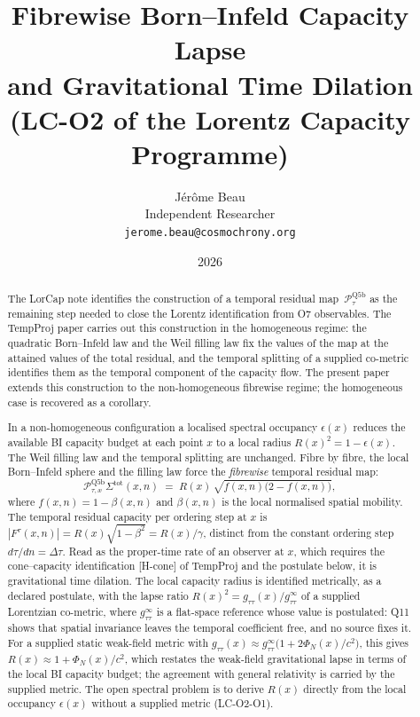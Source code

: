 \documentclass[11pt,a4paper]{article}
\title{Fibrewise Born--Infeld Capacity Lapse\\
and Gravitational Time Dilation\\
\large (LC-O2 of the Lorentz Capacity Programme)}
\author{J\'er\^ome Beau\\
\small Independent Researcher\\
\small \texttt{jerome.beau@cosmochrony.org}}
\date{2026}
\begin{document}
  \maketitle

  \begin{abstract}
    The LorCap note identifies the construction of a temporal residual
    map~$\mathcal{P}_\tau^{\mathrm{Q5b}}$ as the remaining step needed to close the Lorentz
    identification from O7 observables.
    The TempProj paper carries out this construction in the homogeneous regime: the quadratic Born--Infeld law
    and the Weil filling law fix the values of the map at the attained values of the total residual, and the
    temporal splitting of a supplied co-metric identifies them as the temporal component of the capacity flow.
    The present paper extends this construction to the non-homogeneous fibrewise regime;
    the homogeneous case is recovered as a corollary.

    In a non-homogeneous configuration a localised spectral occupancy $\epsilon(x)$
    reduces the available BI capacity budget at each point $x$ to a local radius
    $R(x)^2 = 1-\epsilon(x)$.
    The Weil filling law and the temporal splitting are unchanged.
    Fibre by fibre, the local Born--Infeld sphere and the filling law force the
    \emph{fibrewise} temporal residual map:
    \[
      \mathcal{P}_{\tau,x}^{\mathrm{Q5b}}\Sigma^{\mathrm{tot}}(x,n)
      \;=\; R(x)\,\sqrt{f(x,n)\bigl(2-f(x,n)\bigr)},
    \]
    where $f(x,n) = 1-\beta(x,n)$ and $\beta(x,n)$ is the local normalised spatial
    mobility.
    The temporal residual capacity per ordering step at $x$ is $|F^\tau(x,n)| = R(x)\sqrt{1-\beta^2} = R(x)/\gamma$,
    distinct from the constant ordering step $d\tau/dn = \Delta\tau$.
    Read as the proper-time rate of an observer at $x$, which requires the cone--capacity identification [H-cone]
    of TempProj and the postulate below, it is gravitational time dilation.
    The local capacity radius is identified metrically, as a declared postulate, with the lapse ratio
    $R(x)^2 = g_{\tau\tau}(x)/g_{\tau\tau}^\infty$ of a supplied Lorentzian co-metric, where
    $g_{\tau\tau}^\infty$ is a flat-space reference whose value is postulated: Q11 shows that spatial
    invariance leaves the temporal coefficient free, and no source fixes it.
    For a supplied static weak-field metric with
    $g_{\tau\tau}(x) \approx g_{\tau\tau}^\infty\bigl(1 + 2\Phi_N(x)/c^2\bigr)$, this gives
    $R(x) \approx 1 + \Phi_N(x)/c^2$, which restates the weak-field gravitational lapse in terms of the local
    BI capacity budget; the agreement with general relativity is carried by the supplied metric.
    The open spectral problem is to derive $R(x)$ directly from the local occupancy
    $\epsilon(x)$ without a supplied metric (LC-O2-O1).


\end{abstract}
\end{document}
